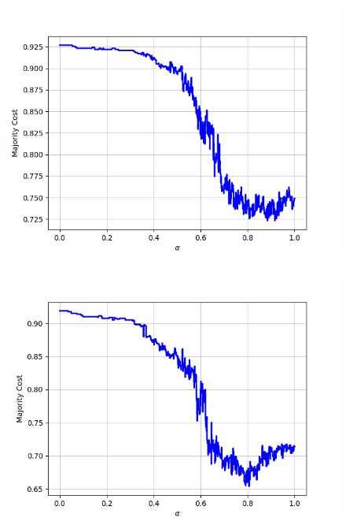 \begin{figure}[H]
\begin{minipage}{.24\textwidth}
  {\includegraphics[width=\linewidth]{plots/omniglot-intra-sc/Arcadian}}
\end{minipage}
\begin{minipage}{.24\textwidth}
  \centering
  {\includegraphics[width=\linewidth]{plots/omniglot-intra-sc/Armenian}}
\end{minipage}
\begin{minipage}{.24\textwidth}
  \centering

\end{minipage}
\end{figure}
